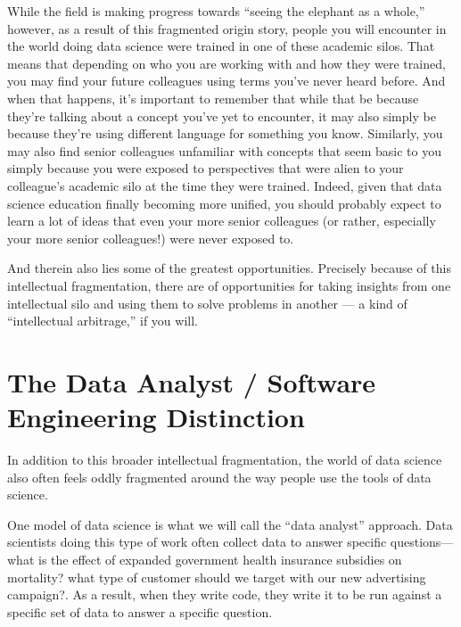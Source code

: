 \documentclass[letterpaper,10pt,english]{jupyterBook}
\begin{document}
\sphinxAtStartPar
While the field is making progress towards “seeing the elephant as a whole,” however, as a result of this fragmented origin story,  people you will encounter in the world doing data science were trained in one of these academic silos. That means that depending on who you are working with and how they were trained, you may find your future colleagues using terms you’ve never heard before. And when that happens, it’s important to remember that while that  be because they’re talking about a concept you’ve yet to encounter, it may also simply be because they’re using different language for something you know. Similarly, you may also find senior colleagues unfamiliar with concepts that seem basic to you simply because you were exposed to perspectives that were alien to your colleague’s academic silo at the time they were trained. Indeed, given that data science education  finally becoming more unified, you should probably expect to learn a lot of ideas that even your more senior colleagues (or rather, especially your more senior colleagues!) were never exposed to.

\sphinxAtStartPar
And therein also lies some of the greatest opportunities. Precisely because of this intellectual fragmentation, there are  of opportunities for taking insights from one intellectual silo and using them to solve problems in another — a kind of “intellectual arbitrage,” if you will.


\section{The Data Analyst / Software Engineering Distinction}
\label{\detokenize{10_introduction/40_data_science_in_historical_context:the-data-analyst-software-engineering-distinction}}
\sphinxAtStartPar
In addition to this broader intellectual fragmentation, the world of data science also often feels oddly fragmented around the way people use the tools of data science.

\sphinxAtStartPar
One model of data science is what we will call the “data analyst” approach. Data scientists doing this type of work often collect data to answer specific questions—what is the effect of expanded government health insurance subsidies on mortality? what type of customer should we target with our new advertising campaign?. As a result, when they write code, they write it to be run against a specific set of data to answer a specific question.
\end{document}
